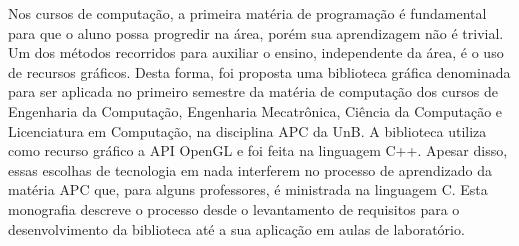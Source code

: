 Nos cursos de computação, a primeira matéria de programação é fundamental para que o aluno possa progredir na área, porém sua aprendizagem não é trivial. Um dos métodos recorridos para auxiliar o ensino, independente da área, é o uso de recursos gráficos. Desta forma, foi proposta uma biblioteca gráfica denominada \playAPC{} para ser aplicada no primeiro semestre da matéria de computação dos cursos de Engenharia da Computação, Engenharia Mecatrônica, Ciência da Computação e Licenciatura em Computação, na disciplina \acrfull{APC} da \acrfull{UnB}. A biblioteca utiliza como recurso gráfico a \acrshort{API} OpenGL e foi feita na linguagem C++. Apesar disso, essas escolhas de tecnologia em nada interferem no processo de aprendizado da matéria \acrshort{APC} que, para alguns professores, é ministrada na linguagem C. Esta monografia descreve o processo desde o levantamento de requisitos para o desenvolvimento da biblioteca até a sua aplicação em aulas de laboratório.

